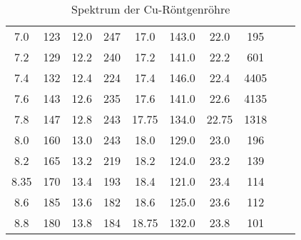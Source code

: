 \begin{table}
\begin{tabular}{S S S S S S S S S S}
        7.0 & 123      & 12.0 & 247          & 17.0 & 143.0         & 22.0 &  195 &  & \\
        7.2 & 129      & 12.2 & 240          & 17.2 & 141.0         & 22.2 &  601 &  & \\
        7.4 & 132      & 12.4 & 224          & 17.4 & 146.0         & 22.4 & 4405 &  & \\
        7.6 & 143      & 12.6 & 235          & 17.6 & 141.0         & 22.6 & 4135 &  & \\
        7.8 & 147      & 12.8 & 243          & 17.75& 134.0         & 22.75& 1318 &  & \\
        8.0 & 160      & 13.0 & 243          & 18.0 & 129.0         & 23.0 &  196 &  & \\
        8.2 & 165      & 13.2 & 219          & 18.2 & 124.0         & 23.2 &  139 &  & \\
        8.35& 170      & 13.4 & 193          & 18.4 & 121.0         & 23.4 &  114 &  & \\
        8.6 & 185      & 13.6 & 182          & 18.6 & 125.0         & 23.6 &  112 &  & \\
        8.8 & 180      & 13.8 & 184          & 18.75& 132.0        & 23.8 &   101 &  & \\
        \bottomrule
    \end{tabular}
    \caption{Spektrum der Cu-Röntgenröhre}
    \label{tab:c02_Cu-Roere_grob}
\end{table}
